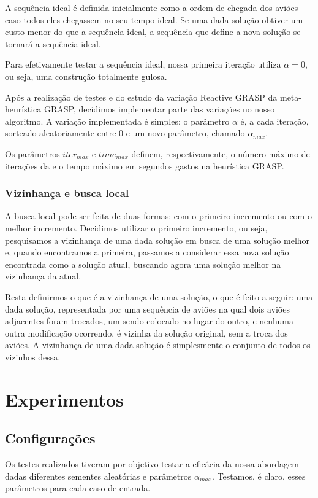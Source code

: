 \documentclass[a4paper,10pt]{abnt} %
\begin{document}
A sequência ideal é definida inicialmente como a ordem de chegada dos aviões caso todos eles chegassem no seu tempo ideal. Se uma dada solução obtiver um custo menor do que a sequência ideal, a sequência que define a nova solução se tornará a sequência ideal.

Para efetivamente testar a sequência ideal, nossa primeira iteração utiliza $\alpha = 0$, ou seja, uma construção totalmente gulosa.

Após a realização de testes e do estudo da variação Reactive GRASP da meta-heurística GRASP, decidimos implementar parte das variações no nosso algoritmo. A variação implementada é simples: o parâmetro $\alpha$ é, a cada iteração, sorteado aleatoriamente entre 0 e um novo parâmetro, chamado $\alpha_{max}$.

Os parâmetros $iter_{max}$ e $time_{max}$ definem, respectivamente, o número máximo de iterações da e o tempo máximo em segundos gastos na heurística GRASP.

\subsection{Vizinhança e busca local}

A busca local pode ser feita de duas formas: com o primeiro incremento ou com o melhor incremento. Decidimos utilizar o primeiro incremento, ou seja, pesquisamos a vizinhança de uma dada solução em busca de uma solução melhor e, quando encontramos a primeira, passamos a considerar essa nova solução encontrada como a solução atual, buscando agora uma solução melhor na vizinhança da atual.

Resta definirmos o que é a vizinhança de uma solução, o que é feito a seguir: uma dada solução, representada por uma sequência de aviões na qual dois aviões adjacentes foram trocados, um sendo colocado no lugar do outro, e nenhuma outra modificação ocorrendo, é vizinha da solução original, sem a troca dos aviões. A vizinhança de uma dada solução é simplesmente o conjunto de todos os vizinhos dessa.

\chapter{Experimentos}

\section{Configurações}

Os testes realizados tiveram por objetivo testar a eficácia da nossa abordagem dadas diferentes sementes aleatórias e parâmetros $\alpha_{max}$. Testamos, é claro, esses parâmetros para cada caso de entrada.
\end{document}
